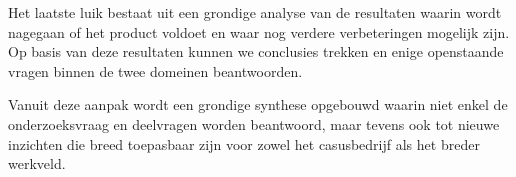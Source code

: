 Het laatste luik bestaat uit een grondige analyse van de resultaten waarin wordt nagegaan of het product voldoet en waar nog verdere verbeteringen mogelijk zijn. Op basis van deze resultaten kunnen we conclusies trekken en enige openstaande vragen binnen de twee domeinen beantwoorden.\newline
 
Vanuit deze aanpak wordt een grondige synthese opgebouwd waarin niet enkel de onderzoeksvraag en deelvragen worden beantwoord, maar tevens ook tot nieuwe inzichten die breed toepasbaar zijn voor zowel het casusbedrijf als het breder werkveld.


